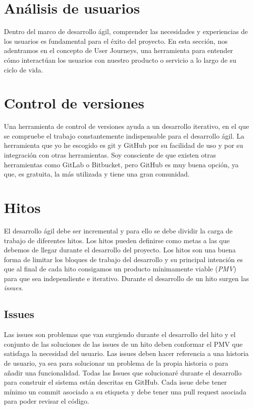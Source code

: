 \section{Análisis de usuarios}
Dentro del marco de desarrollo ágil, comprender las necesidades y experiencias de los usuarios es fundamental para el éxito del proyecto.
En esta sección, nos adentramos en el concepto de User Journeys, una herramienta para entender cómo interactúan los usuarios con nuestro producto o servicio a lo largo de su ciclo de vida.



\section{Control de versiones}
Una herramienta de control de versiones ayuda a un desarrollo iterativo, en el que se compruebe el trabajo constantemente indispensable para el desarrollo ágil.
La herramienta que yo he escogido es git y GitHub por su facilidad de uso y por su integración con otras herramientas.
Soy consciente de que existen otras herramientas como GitLab o Bitbucket, pero GitHub es muy buena opción, ya que, es gratuita, la más utilizada y tiene una gran comunidad.

\section{Hitos}
El desarrollo ágil debe ser incremental y para ello se debe dividir la carga de trabajo de diferentes hitos.
Los hitos pueden definirse como metas a las que debemos de llegar durante el desarrollo del proyecto.
Los hitos son una buena forma de limitar los bloques de trabajo del desarrollo y su principal intención es que
al final de cada hito consigamos un producto mínimamente viable (\textit{PMV}) para que sea independiente e iterativo.
Durante el desarrollo de un hito surgen las \textit{issues}.

\subsection{Issues}
Las issues son problemas que van surgiendo durante el desarrollo del hito y
el conjunto de las soluciones de las issues de un hito deben conformar el PMV que satisfaga la necesidad del usuario.
Las issues deben hacer referencia a una historia de usuario, ya sea para solucionar un problema de la propia historia o para añadir una funcionalidad.
Todas las Issues que solucionaré durante el desarrollo para construir el sistema están descritas en GitHub. Cada issue debe tener mínimo un commit asociado a su
etiqueta y debe tener una pull request asociada para poder revisar el código.

